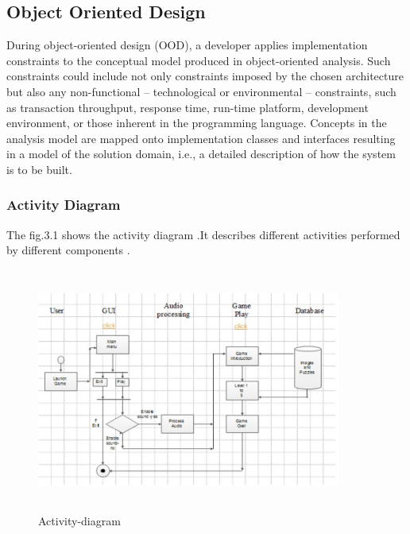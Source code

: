 \subsection{Object Oriented Design}
\hspace{1cm}During object-oriented design (OOD), a developer applies
implementation constraints to the conceptual model produced in
object-oriented analysis. Such constraints could include not only
constraints imposed by the chosen architecture but also any
non-functional – technological or environmental – constraints, such as
transaction throughput, response time, run-time platform, development
environment, or those inherent in the programming language. Concepts
in the analysis model are mapped onto implementation classes and
interfaces resulting in a model of the solution domain, i.e., a
detailed description of how the system is to be built.
\subsubsection{Activity Diagram}
\hspace{1cm} The fig.3.1 shows the activity diagram .It describes different activities performed by different components .
\vspace {0.5cm}
\begin{figure}[htbp]
	\centering
	\includegraphics[width=10cm,height=8cm]{activity.jpg}
	\caption{Activity-diagram}
\end{figure}
\vspace{5cm}
